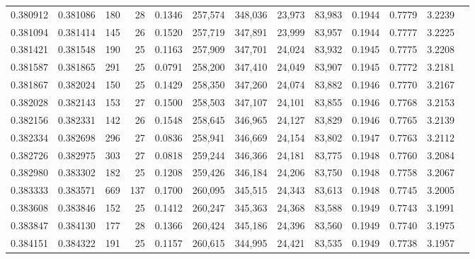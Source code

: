 \begin{tabular}{rrrrrrrrrrrrr}
0.380912 & 0.381086 &    180 &    28 &                                     0.1346 & 257,574 & 348,036 &  23,973 &  83,983 & 0.1944 & 0.7779 & 3.2239 \\
0.381094 & 0.381414 &    145 &    26 &                                     0.1520 & 257,719 & 347,891 &  23,999 &  83,957 & 0.1944 & 0.7777 & 3.2225 \\
0.381421 & 0.381548 &    190 &    25 &                                     0.1163 & 257,909 & 347,701 &  24,024 &  83,932 & 0.1945 & 0.7775 & 3.2208 \\
0.381587 & 0.381865 &    291 &    25 &                                     0.0791 & 258,200 & 347,410 &  24,049 &  83,907 & 0.1945 & 0.7772 & 3.2181 \\
0.381867 & 0.382024 &    150 &    25 &                                     0.1429 & 258,350 & 347,260 &  24,074 &  83,882 & 0.1946 & 0.7770 & 3.2167 \\
0.382028 & 0.382143 &    153 &    27 &                                     0.1500 & 258,503 & 347,107 &  24,101 &  83,855 & 0.1946 & 0.7768 & 3.2153 \\
0.382156 & 0.382331 &    142 &    26 &                                     0.1548 & 258,645 & 346,965 &  24,127 &  83,829 & 0.1946 & 0.7765 & 3.2139 \\
0.382334 & 0.382698 &    296 &    27 &                                     0.0836 & 258,941 & 346,669 &  24,154 &  83,802 & 0.1947 & 0.7763 & 3.2112 \\
0.382726 & 0.382975 &    303 &    27 &                                     0.0818 & 259,244 & 346,366 &  24,181 &  83,775 & 0.1948 & 0.7760 & 3.2084 \\
0.382980 & 0.383302 &    182 &    25 &                                     0.1208 & 259,426 & 346,184 &  24,206 &  83,750 & 0.1948 & 0.7758 & 3.2067 \\
0.383333 & 0.383571 &    669 &   137 &                                     0.1700 & 260,095 & 345,515 &  24,343 &  83,613 & 0.1948 & 0.7745 & 3.2005 \\
0.383608 & 0.383846 &    152 &    25 &                                     0.1412 & 260,247 & 345,363 &  24,368 &  83,588 & 0.1949 & 0.7743 & 3.1991 \\
0.383847 & 0.384130 &    177 &    28 &                                     0.1366 & 260,424 & 345,186 &  24,396 &  83,560 & 0.1949 & 0.7740 & 3.1975 \\
0.384151 & 0.384322 &    191 &    25 &                                     0.1157 & 260,615 & 344,995 &  24,421 &  83,535 & 0.1949 & 0.7738 & 3.1957 \\

\end{tabular}
